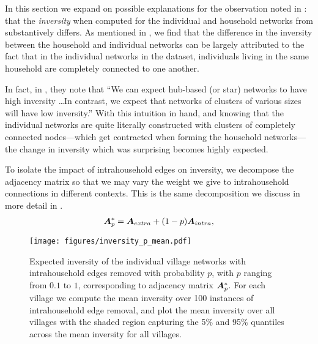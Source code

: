 In this section we expand on possible explanations for the observation noted in \cite{kumar2024friendship}: that the \textit{inversity} when computed for the individual and household networks from \cite{banerjee2013} substantively differs. As mentioned in , we find that the difference in the inversity between the household and individual networks can be largely attributed to the fact that in the individual networks in the \cite{banerjee2013} dataset, individuals living in the same household are completely connected to one another. 

In fact, in \cite{kumar2024friendship}, they note that ``We can expect hub-based (or star) networks to have high inversity \dots In contrast, we expect that networks of clusters of various sizes will have low inversity.'' With this intuition in hand, and knowing that the individual networks are quite literally constructed with clusters of completely connected nodes---which get contracted when forming the household networks---the change in inversity which was surprising becomes highly expected. 

To isolate the impact of intrahousehold edges on inversity, we decompose the adjacency matrix so that we may vary the weight we give to intrahousehold connections in different contexts. This is the same decomposition we discuss in more detail in .
\begin{align}
    \boldsymbol{A}^*_p = \boldsymbol{A}_{extra} + (1- p) \boldsymbol{A}_{intra},
\end{align}

\begin{figure}
    \centering
    \texttt{[image: figures/inversity\_p\_mean.pdf]}
    \caption{Expected inversity of the individual village networks with intrahousehold edges removed with probability $p$, with $p$ ranging from $0.1$ to $1$, corresponding to adjacency matrix $\boldsymbol{A}^*_p$. For each village we compute the mean inversity over 100 instances of intrahousehold edge removal, and plot the mean inversity over all villages with the shaded region capturing the 5\% and 95\% quantiles across the mean inversity for all villages.}
    \label{fig:inv_p_dots}
\end{figure}

